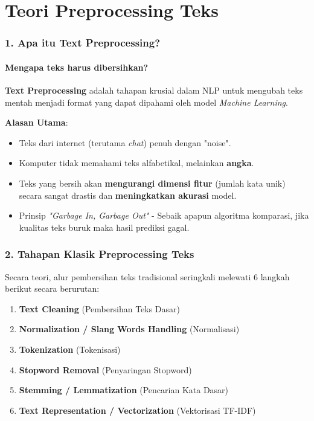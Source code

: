 \documentclass[t,aspectratio=169,xcolor=dvipsnames]{beamer}
\begin{document}
\section{Teori Preprocessing Teks}

\begin{frame}
    \frametitle{1. Apa itu Text Preprocessing?}
    \framesubtitle{Mengapa teks harus dibersihkan?}
    \small
    \textbf{Text Preprocessing} adalah tahapan krusial dalam NLP untuk mengubah teks mentah menjadi format yang dapat dipahami oleh model \textit{Machine Learning}.
    
    \vspace{0.3cm}
    \textbf{Alasan Utama}:
    \begin{itemize}
        \item Teks dari internet (terutama \textit{chat}) penuh dengan "noise".
        \item Komputer tidak memahami teks alfabetikal, melainkan \textbf{angka}.
        \item Teks yang bersih akan \textbf{mengurangi dimensi fitur} (jumlah kata unik) secara sangat drastis dan \textbf{meningkatkan akurasi} model.
        \item Prinsip \textit{"Garbage In, Garbage Out"} - Sebaik apapun algoritma komparasi, jika kualitas teks buruk maka hasil prediksi gagal.
    \end{itemize}
\end{frame}

\begin{frame}
    \frametitle{2. Tahapan Klasik Preprocessing Teks}
    \small
    Secara teori, alur pembersihan teks tradisional seringkali melewati 6 langkah berikut secara berurutan:
    \vspace{0.3cm}
    \begin{enumerate}
        \item \textbf{Text Cleaning} (Pembersihan Teks Dasar)
        \item \textbf{Normalization / Slang Words Handling} (Normalisasi)
        \item \textbf{Tokenization} (Tokenisasi)
        \item \textbf{Stopword Removal} (Penyaringan Stopword)
        \item \textbf{Stemming / Lemmatization} (Pencarian Kata Dasar)
        \item \textbf{Text Representation / Vectorization} (Vektorisasi TF-IDF)
    \end{enumerate}
\end{frame}
\end{document}
